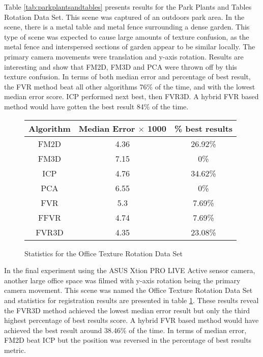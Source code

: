Table \ref{tab:parkplantsandtables} presents results for the Park Plants and Tables Rotation Data Set. This scene was captured of an outdoors park area. In the scene, there is a metal table and metal fence surrounding a dense garden. This type of scene was expected to cause large amounts of texture confusion, as the metal fence and interspersed sections of garden appear to be similar locally. The primary camera movements were translation and y-axis rotation. Results are interesting and show that FM2D, FM3D and PCA were thrown off by this texture confusion. In terms of both median error and percentage of best result, the FVR method beat all other algorithms 76\% of the time, and with the lowest median error score. ICP performed next best, then FVR3D. A hybrid FVR based method would have gotten the best result 84\% of the time. \\



\begin{figure}
\centering
\begin{tabular}{ccc}
\hline
\textbf{Algorithm} & \textbf{Median Error $\times$ 1000} & \textbf{\% best results}\\ \hline
FM2D	& 4.36 & 26.92\%\\
FM3D	& 7.15 & 0\%\\
ICP	& 4.76 & 34.62\%\\
PCA	& 6.55 & 0\%\\
FVR	& 5.3 & 7.69\%\\
FFVR	& 4.74 & 7.69\%\\
FVR3D	& 4.35 & 23.08\%\\
\end{tabular}
\caption{Statistics for the Office Texture Rotation Data Set}
\label{tab:officetexturerotation}
\end{figure} 

In the final experiment using the ASUS Xtion PRO LIVE Active sensor camera, another large office space was filmed with y-axis rotation being the primary camera movement. This scene was named the Office Texture Rotation Data Set and statistics for registration results are presented in table \ref{tab:officetexturerotation}. These results reveal the FVR3D method achieved the lowest median error result but only the third highest percentage of best results score. A hybrid FVR based method would have achieved the best result around 38.46\% of the time. In terms of median error, FM2D beat ICP but the position was reversed in the percentage of best results metric. 

